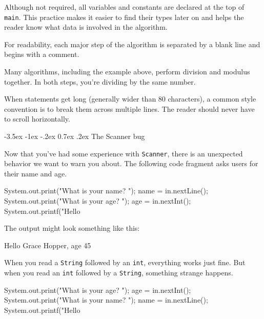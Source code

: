\documentclass[12pt]{book}
\makeatletter
\theoremstyle{exercise}
\newcommand{\java}[1]{\verb"#1"}
\renewcommand{\section}{\@startsection{section}{1}{\z@}%
    {-3.5ex \@plus -1ex \@minus -.2ex}%
    {0.7ex \@plus.2ex}%
    {\normalfont\Large\bfseries}}
\newcommand{\java}[1]{\lstinline{#1}} %
\makeatother
\begin{document}
Although not required, all variables and constants are declared at the top of \java{main}.
This practice makes it easier to find their types later on and helps the reader know what data is involved in the algorithm.

For readability, each major step of the algorithm is separated by a blank line and begins with a comment.

Many algorithms, including the example above, perform division and modulus together.
In both steps, you're dividing by the same number.


When statements get long (generally wider than 80 characters), a common style convention is to break them across multiple lines.
The reader should never have to scroll horizontally.



\section{The Scanner bug}

Now that you've had some experience with \java{Scanner}, there is an unexpected behavior we want to warn you about.
The following code fragment asks users for their name and age.

\begin{code}
    System.out.print("What is your name? ");
    name = in.nextLine();
    System.out.print("What is your age? ");
    age = in.nextInt();
    System.out.printf("Hello %
\end{code}

The output might look something like this:

\begin{stdout}
Hello Grace Hopper, age 45
\end{stdout}

When you read a \java{String} followed by an \java{int}, everything works just fine.
But when you read an \java{int} followed by a \java{String}, something strange happens.

\begin{code}
    System.out.print("What is your age? ");
    age = in.nextInt();
    System.out.print("What is your name? ");
    name = in.nextLine();
    System.out.printf("Hello %
\end{code}
\end{document}
